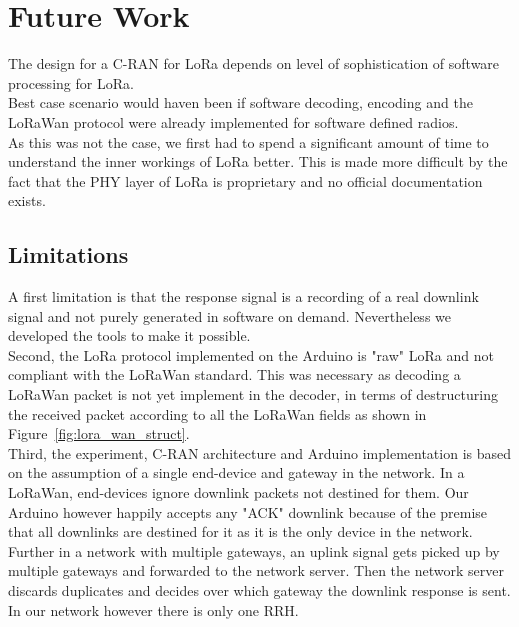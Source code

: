 \chapter{Future Work}
The design for a C-RAN for LoRa depends on level of sophistication of
software processing for LoRa. \\
Best case scenario would haven been if software decoding, encoding and the LoRaWan protocol
were already implemented for software defined radios.
\\
As this was not the case, we first had to spend a significant amount of time 
to understand the inner workings of LoRa better. This is made more difficult by the fact 
that the PHY layer of LoRa is proprietary and no official documentation exists.

\section{Limitations}
A first limitation is that the response signal is a recording of a real downlink signal and not 
purely generated in software on demand. Nevertheless we developed the tools to make it possible.
\\
Second, the LoRa protocol implemented on the Arduino is "raw" LoRa and not compliant 
with the LoRaWan standard. This was necessary as decoding a LoRaWan packet is not yet implement in 
the decoder, in terms of destructuring the received packet according to all the LoRaWan fields as shown
in Figure~\ref{fig:lora_wan_struct}.
\\
Third, the experiment, C-RAN architecture and Arduino implementation is based on the assumption 
of a single end-device and gateway in the network. In a LoRaWan, end-devices ignore downlink packets
not destined for them. Our Arduino however happily accepts any "ACK" downlink because of the premise that 
all downlinks are destined for it as it is the only device in the network.\\
Further in a network with multiple gateways, an uplink signal gets picked up by multiple gateways and 
forwarded to the network server. Then the network server discards duplicates and decides over which gateway
the downlink response is sent. In our network however there is only one RRH.

